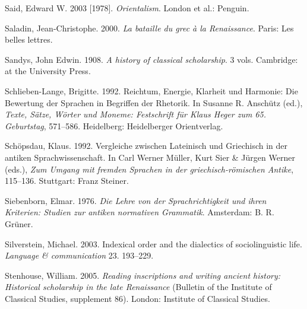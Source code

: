 \begin{styleStandard}
Said, Edward W. 2003 [1978]. \textit{Orientalism}. London et al.: Penguin.
\end{styleStandard}

\begin{styleStandard}
Saladin, Jean-Christophe. 2000. \textit{La bataille du grec à la Renaissance}. Paris: Les belles lettres.
\end{styleStandard}

\begin{styleStandard}
Sandys, John Edwin. 1908. \textit{A history of classical scholarship}. 3 vols. Cambridge: at the University Press.
\end{styleStandard}

\begin{styleStandard}
Schlieben-Lange, Brigitte. 1992. Reichtum, Energie, Klarheit und Harmonie: Die Bewertung der Sprachen in Begriffen der Rhetorik. In Susanne R. Anschütz (ed.), \textit{Texte, Sätze, Wörter und Moneme: Festschrift für Klaus Heger zum 65. Geburtstag}, 571–586. Heidelberg: Heidelberger Orientverlag.
\end{styleStandard}

\begin{styleStandard}
Schöpsdau, Klaus. 1992. Vergleiche zwischen Lateinisch und Griechisch in der antiken Sprachwissenschaft. In Carl Werner Müller, Kurt Sier \& Jürgen Werner (eds.), \textit{Zum Umgang mit fremden Sprachen in der griechisch-römischen Antike}, 115–136. Stuttgart: Franz Steiner.
\end{styleStandard}

\begin{styleStandard}
Siebenborn, Elmar. 1976. \textit{Die Lehre von der Sprachrichtigkeit und ihren Kriterien: Studien zur antiken normativen Grammatik}. Amsterdam: B. R. Grüner.
\end{styleStandard}

\begin{styleStandard}
Silverstein, Michael. 2003. Indexical order and the dialectics of sociolinguistic life. \textit{Language \& communication} 23. 193–229.
\end{styleStandard}

\begin{styleStandard}
Stenhouse, William. 2005. \textit{Reading inscriptions and writing ancient history: Historical scholarship in the late Renaissance} (Bulletin of the Institute of Classical Studies, supplement 86). London: Institute of Classical Studies.
\end{styleStandard}

